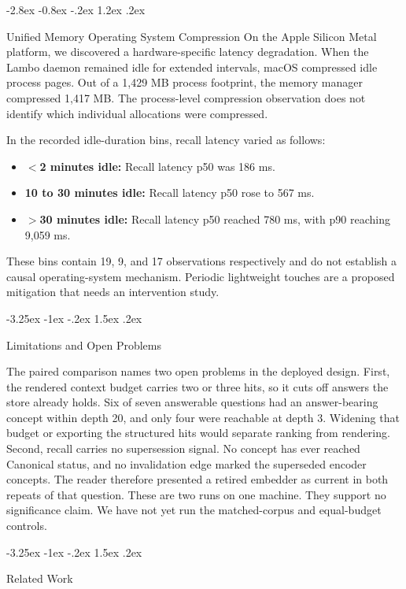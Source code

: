 \documentclass[10pt,twocolumn]{article}
\makeatletter
\renewcommand\section{\@startsection{section}{1}{\z@}%
  {-3.25ex \@plus -1ex \@minus -.2ex}%
  {1.5ex \@plus .2ex}%
  {\normalfont\large\bfseries\raggedright}}
\renewcommand\subsection{\@startsection{subsection}{2}{\z@}%
  {-2.8ex \@plus -0.8ex \@minus -.2ex}%
  {1.2ex \@plus .2ex}%
  {\normalfont\normalsize\bfseries\raggedright}}
\makeatother
\begin{document}
\subsection{Unified Memory Operating System Compression}
On the Apple Silicon Metal platform, we discovered a hardware-specific latency degradation.
When the Lambo daemon remained idle for extended intervals, macOS compressed idle process pages.
Out of a 1,429 MB process footprint, the memory manager compressed 1,417 MB.
The process-level compression observation does not identify which individual allocations were compressed.

In the recorded idle-duration bins, recall latency varied as follows:
\begin{itemize}
    \item \textbf{$<$2 minutes idle:} Recall latency p50 was 186 ms.
    \item \textbf{10 to 30 minutes idle:} Recall latency p50 rose to 567 ms.
    \item \textbf{$>$30 minutes idle:} Recall latency p50 reached 780 ms, with p90 reaching 9,059 ms.
\end{itemize}
These bins contain 19, 9, and 17 observations respectively and do not establish a causal operating-system mechanism. Periodic lightweight touches are a proposed mitigation that needs an intervention study.

\section{Limitations and Open Problems}

The paired comparison names two open problems in the deployed design.
First, the rendered context budget carries two or three hits, so it cuts off answers the store already holds. Six of seven answerable questions had an answer-bearing concept within depth 20, and only four were reachable at depth 3. Widening that budget or exporting the structured hits would separate ranking from rendering.
Second, recall carries no supersession signal. No concept has ever reached Canonical status, and no invalidation edge marked the superseded encoder concepts. The reader therefore presented a retired embedder as current in both repeats of that question.
These are two runs on one machine. They support no significance claim. We have not yet run the matched-corpus and equal-budget controls.

\section{Related Work}
\end{document}
